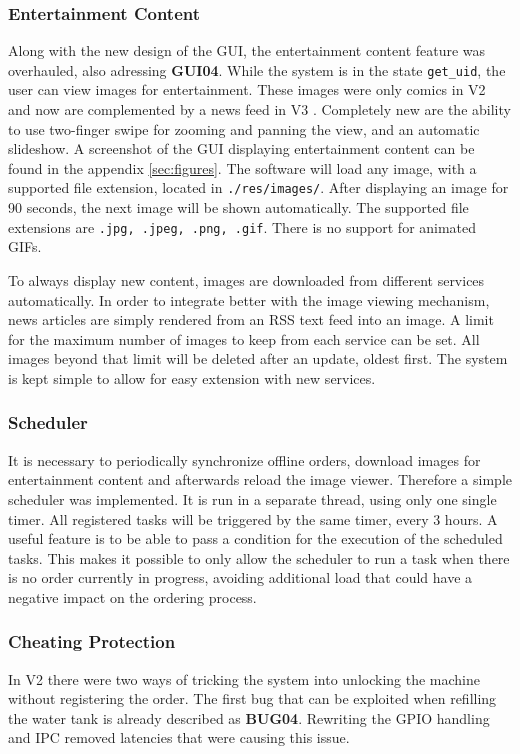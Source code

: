 \documentclass[12pt]{article}
\begin{document}
\subsubsection{Entertainment Content}
Along with the new design of the GUI, the entertainment content feature was overhauled, also adressing \textbf{GUI04}.
While the system is in the state \texttt{get\_uid}, the user can view images for entertainment.
These images were only comics in V2 and now are complemented by a news feed in V3 .
Completely new are the ability to use two-finger swipe for zooming and panning the view,
and an automatic slideshow. A screenshot of the GUI displaying entertainment content can be found in the appendix \ref{sec:figures}.
The software will load any image, with a supported file extension, located in \texttt{./res/images/}.
After displaying an image for 90 seconds, the next image will be shown automatically.
The supported file extensions are \texttt{.jpg, .jpeg, .png, .gif}.
There is no support for animated GIFs.

To always display new content, images are downloaded from different services automatically.
In order to integrate better with the image viewing mechanism,
news articles are simply rendered from an RSS text feed into an image. 
A limit for the maximum number of images to keep from each service can be set.
All images beyond that limit will be deleted after an update, oldest first.
The system is kept simple to allow for easy extension with new services.


\subsubsection{Scheduler}
It is necessary to periodically synchronize offline orders, download images for entertainment content and afterwards reload the image viewer.
Therefore a simple scheduler was implemented. It is run in a separate thread, using only one single timer.
All registered tasks will be triggered by the same timer, every 3 hours.
A useful feature is to be able to pass a condition for the execution of the scheduled tasks. 
This makes it possible to only allow the scheduler to run a task when there is no order currently in progress,
avoiding additional load that could have a negative impact on the ordering process.

\subsubsection{Cheating Protection}
In V2 there were two ways of tricking the system into unlocking the machine without registering the order.
The first bug that can be exploited when refilling the water tank is already described as \textbf{BUG04}.
Rewriting the GPIO handling and IPC removed latencies that were causing this issue.
\end{document}
